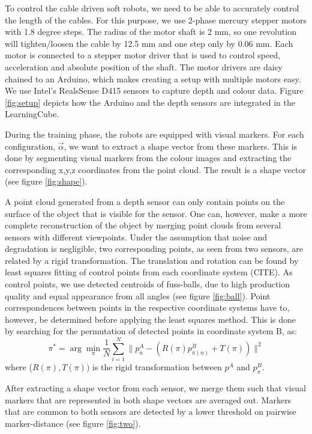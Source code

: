 \documentclass[letterpaper, 10 pt, conference]{ieeeconf}  %
\begin{document}
To control the cable driven soft robots, we need to be able to accurately control the length of the cables. For this purpose, we use 2-phase mercury stepper motors with 1.8 degree steps. The radius of the motor shaft is 2 mm, so one revolution will tighten/loosen the cable by 12.5 mm and one step only by 0.06 mm. Each motor is connected to a stepper motor driver that is used to control speed, acceleration and absolute position of the shaft. The motor drivers are daisy chained to an Arduino, which makes creating a setup with multiple motors easy. We use Intel's RealsSense D415 sensors to capture depth and colour data. Figure \ref{fig:setup} depicts how the Arduino and the depth sensors are integrated in the LearningCube. 

During the training phase, the robots are equipped with visual markers. For each configuration, $\vec{\alpha}$, we want to extract a shape vector from these markers. This is done by segmenting visual markers from the colour images and extracting the corresponding x,y,z coordinates from the point cloud. The result is a shape vector (see figure \ref{fig:shape}).

A point cloud generated from a depth sensor can only contain points on the surface of the object that is visible for the sensor. One can, however, make a more complete reconstruction of the object by merging point clouds from several sensors with different viewpoints. Under the assumption that noise and degradation is negligible, two corresponding points, as seen from two sensors, are related by a rigid transformation. The translation and rotation can be found by least squares fitting of control points from each coordinate system (CITE). As control points, we use detected centroids of fuss-balls, due to high production quality and equal appearance from all angles (see figure \ref{fig:ball}). 
Point correspondences between points in the respective coordinate systems have to, however, be determined before applying the least squares method. This is done by searching for the permutation of detected points in coordinate system B, as:
$$
    \pi^* = \arg \min_{\pi} \frac{1}{N}\sum_{i=1}^N \|p^A_n- (R(\pi)p^B_{\pi(n)} + T(\pi))\|^2
$$
where ($R(\pi), T(\pi))$ is the rigid transformation between $p^A $ and $p^B_{\pi}$.

After extracting a shape vector from each sensor, we merge them such that visual markers that are represented in both shape vectors are averaged out. Markers that are common to both sensors are detected by a lower threshold on pairwise marker-distance (see figure \ref{fig:two}).
\end{document}
